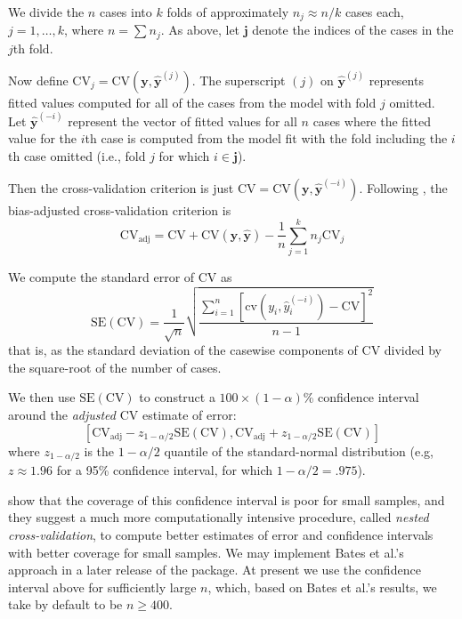 \documentclass[
]{jss}
\begin{document}
We divide the \(n\) cases into \(k\) folds of approximately
\(n_j \approx n/k\) cases each, \(j = 1, \ldots, k\), where
\(n = \sum n_j\). As above, let \(\mathbf{j}\) denote the indices of the
cases in the \(j\)th fold.

Now define
\(\mathrm{CV}_j = \mathrm{CV}(\mathbf{y}, \widehat{\mathbf{y}}^{(j)})\).
The superscript \((j)\) on \(\widehat{\mathbf{y}}^{(j)}\) represents
fitted values computed for all of the cases from the model with fold
\(j\) omitted. Let \(\widehat{\mathbf{y}}^{(-i)}\) represent the vector
of fitted values for all \(n\) cases where the fitted value for the
\(i\)th case is computed from the model fit with the fold including the
\(i\)th case omitted (i.e., fold \(j\) for which \(i \in \mathbf{j}\)).

Then the cross-validation criterion is just
\(\mathrm{CV} = \mathrm{CV}(\mathbf{y}, \widehat{\mathbf{y}}^{(-i)})\).
Following \citet[293--295]{DavisonHinkley:1997}, the bias-adjusted
cross-validation criterion is \[
\mathrm{CV}_{\mathrm{adj}} = \mathrm{CV} + \mathrm{CV}(\mathbf{y}, \widehat{\mathbf{y}}) - \frac{1}{n} \sum_{j=1}^{k} n_j \mathrm{CV}_j
\]

We compute the standard error of CV as \[
\mathrm{SE}(\mathrm{CV}) = \frac{1}{\sqrt n} \sqrt{ \frac{\sum_{i=1}^n \left[ \mathrm{cv}(y_i, \widehat{y}_i^{(-i)} ) - \mathrm{CV} \right]^2 }{n - 1} }
\] that is, as the standard deviation of the casewise components of CV
divided by the square-root of the number of cases.

We then use \(\mathrm{SE}(\mathrm{CV})\) to construct a
\(100 \times (1 - \alpha)\)\% confidence interval around the
\emph{adjusted} CV estimate of error: \[
\left[ \mathrm{CV}_{\mathrm{adj}} - z_{1 - \alpha/2}\mathrm{SE}(\mathrm{CV}), \mathrm{CV}_{\mathrm{adj}} + z_{1 - \alpha/2}\mathrm{SE}(\mathrm{CV})  \right]
\] where \(z_{1 - \alpha/2}\) is the \(1 - \alpha/2\) quantile of the
standard-normal distribution (e.g, \(z \approx 1.96\) for a 95\%
confidence interval, for which \(1 - \alpha/2 = .975\)).

\citet{BatesHastieTibshirani:2023} show that the coverage of this
confidence interval is poor for small samples, and they suggest a much
more computationally intensive procedure, called \emph{nested
cross-validation}, to compute better estimates of error and confidence
intervals with better coverage for small samples. We may implement Bates
et al.'s approach in a later release of the  package. At present
we use the confidence interval above for sufficiently large \(n\),
which, based on Bates et al.'s results, we take by default to be
\(n \ge 400\).


\end{document}
